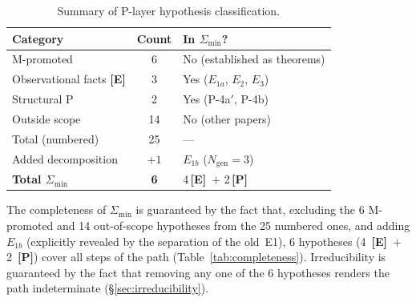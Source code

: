 \documentclass[sn-mathphys-num,Numbered]{sn-jnl}
\theoremstyle{thmstyleone}
\theoremstyle{thmstylethree}
\newcommand{\Amin}{\Sigma_{\min}}
\newcommand{\Ngen}{N_{\mathrm{gen}}}
\newcommand{\layerP}{\textbf{[P]}}
\newcommand{\layerE}{\textbf{[E]}}
\begin{document}
\begin{appendices}
\begin{table}[htb]
\centering
\caption{Summary of P-layer hypothesis classification.}\label{tab:C-summary}
\begin{tabular}{lcl}
\toprule
Category & Count & In $\Amin$? \\
\midrule
M-promoted & 6 & No (established as theorems) \\
Observational facts \layerE & 3 & Yes ($E_{1a}$, $E_2$, $E_3$) \\
Structural P & 2 & Yes (P-4a$'$, P-4b) \\
Outside scope & 14 & No (other papers) \\
\midrule
Total (numbered) & 25 & --- \\
Added decomposition & $+1$ & $E_{1b}$ ($\Ngen = 3$) \\
\midrule
\textbf{Total $\Amin$} & \textbf{6} & 4\,\layerE\ $+$ 2\,\layerP \\
\bottomrule
\end{tabular}
\end{table}

The completeness of $\Amin$ is guaranteed by the fact that, excluding the 6
M-promoted and 14 out-of-scope hypotheses from the 25 numbered ones, and
adding $E_{1b}$ (explicitly revealed by the separation of the old~E1), 6
hypotheses (4~\layerE\ $+$ 2~\layerP) cover all steps of the path
(Table~\ref{tab:completeness}).  Irreducibility is guaranteed by the fact that
removing any one of the 6 hypotheses renders the path indeterminate
(\S\ref{sec:irreducibility}).


\end{appendices}


\end{document}
